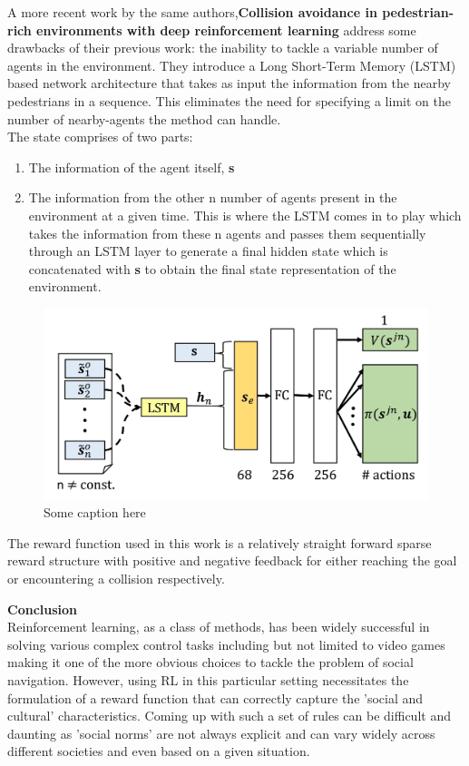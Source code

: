 A more recent work by the same authors,\textbf{Collision avoidance in pedestrian-rich environments with deep reinforcement learning} \cite{everett_collision_2019}
address some drawbacks of their previous work: the inability to tackle a variable number of agents in the environment. They introduce a Long Short-Term Memory (LSTM) \cite{hochreiterLongShortTermMemory1997} based network architecture that takes as input the information from the nearby pedestrians in a sequence. This eliminates the need for specifying a limit on the number of nearby-agents the method can handle.\\
The state comprises of two parts: 
\begin{enumerate}
    \item The information of the agent itself, \textbf{s}
    \item The information from the other n number of agents present in the environment at a given time. This is where the LSTM comes in to play which takes the information from these n agents and passes them sequentially through an LSTM layer to generate a final hidden state which is concatenated with \textbf{s} to obtain the final state representation of the environment.
\end{enumerate}
\begin{figure}[!htbp]
    \centering
    \includegraphics[width=0.6\linewidth]{figures/everett}
    \caption{Some caption here}
    \label{fig:label2}
\end{figure}

The reward function used in this work is a relatively straight forward sparse reward structure with positive and negative feedback for either reaching the goal or encountering a collision respectively.

\textbf{Conclusion}\\
Reinforcement learning, as a class of methods, has been widely successful in solving various complex control tasks including but not limited to video games making it one of the more obvious choices to tackle the problem of social navigation. 
However, using RL in this particular setting necessitates the formulation of a reward function that can correctly capture the 'social and cultural' characteristics. Coming up with such a set of rules can be difficult and daunting as 'social norms' are not always explicit and can vary widely across different societies and even based on a given situation.\\

